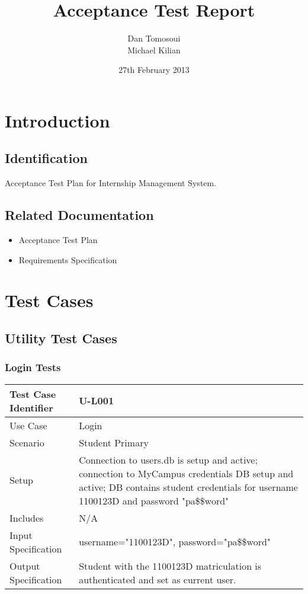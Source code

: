 \documentclass{l3deliverable}
\title{Acceptance Test Report}
\author{
  Dan Tomosoui\\
  Michael Kilian \\
}
\date{27th February 2013}
\begin{document}

\maketitle

\tableofcontents

\newpage


\section{Introduction}

\subsection{Identification}
Acceptance Test Plan for Internship Management System.

\subsection{Related Documentation}
\begin{itemize}
\item{Acceptance Test Plan}
\item{Requirements Specification}
\end{itemize}

\newpage
\section{Test Cases}

\subsection{Utility Test Cases}

\subsubsection{Login Tests}
\begin{tabular}{lp{10cm}}
\hline 
\textbf{Test Case Identifier} & U-L001\tabularnewline
\hline 
\hline 
Use Case & Login \tabularnewline
\hline 
Scenario & Student Primary \tabularnewline
\hline 
Setup &  Connection to users.db is setup and active; connection to MyCampus credentials DB setup and active; DB contains student credentials for username 1100123D and password "pa\$\$word" \tabularnewline
\hline 
Includes &  N/A \tabularnewline
\hline 
Input Specification & username="1100123D", password="pa\$\$word"\tabularnewline
\hline 
Output Specification & Student with the 1100123D matriculation is authenticated and set as current user.\tabularnewline
\hline 
\end{tabular}\\
\end{document}
